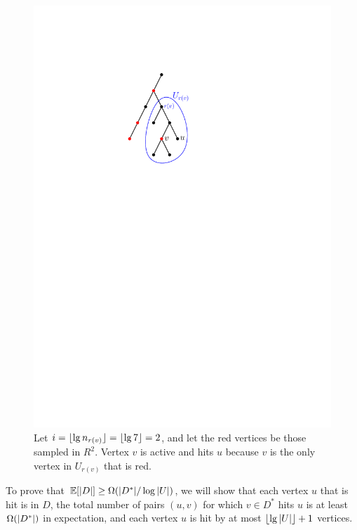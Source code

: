 \begin{figure}\centering
\includegraphics[scale=1]{hits.pdf}
\caption{Let $i=\lfloor\lg n_{r(v)}\rfloor=\lfloor\lg 7\rfloor=2$, and let the red vertices be those sampled in $R^2$. Vertex $v$ is active and hits $u$ because $v$ is the only vertex in $U_{r(v)}$ that is red.}\label{fig:hits}
\end{figure}

To prove that $\mathbb E[|D|] \ge \Omega(|D^*|/\log|U|)$, we will show that
 \BE
 \im[(a)] each vertex $u$ that is hit is in $D$, 
 \im[(b)] the total number of pairs $(u,v)$ for which $v\in D^*$ hits $u$ is at least $\Omega(|D^*|)$ in expectation, and %
 \im[(c)] each vertex $u$ is hit by at most $\lfloor\lg|U|\rfloor+1$ vertices. %
 \EE

